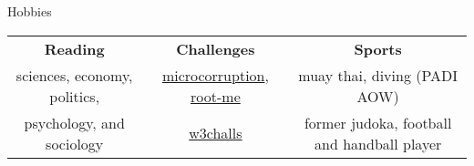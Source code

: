 \begin{rSection}{Hobbies}

  \begin{center}
      \begin{tabular}
          {c | c | c}
          \textbf{Reading} & \textbf{Challenges} & \textbf{Sports} \\
          sciences, economy, politics, & \href{https://microcorruption.com/profile/43775}{microcorruption}, \href{http://www.root-me.org/Pamplemouss_?inc=score&lang=en}{root-me} & muay thai, diving (PADI AOW) \\
          psychology, and sociology & \href{https://w3challs.com/profile/Pamplemouss_}{w3challs} & former judoka, football and handball player \\
      \end{tabular}
  \end{center}

\end{rSection}
